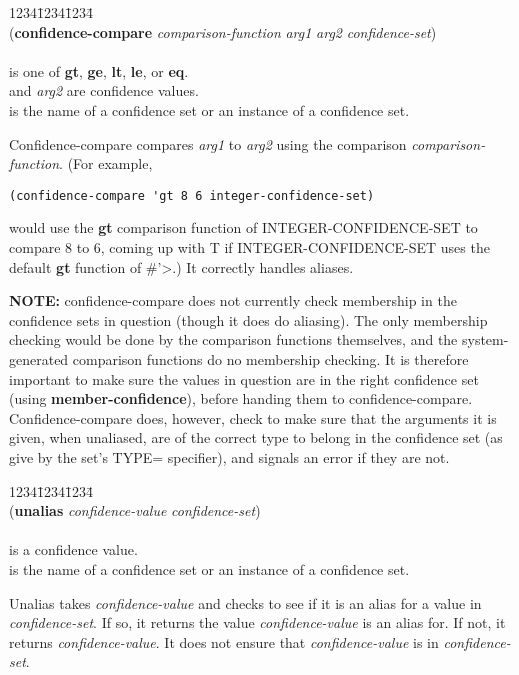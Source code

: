 \begin{tabbing}
1234\=1234\=1234\= \kill
\\
({\bf confidence-compare} {\it comparison-function\/} {\it arg1\/}
{\it arg2\/} {\it confidence-set}) \\
\\
 is one of {\bf gt}, {\bf ge}, {\bf lt},
{\bf le}, or {\bf eq}. \\
 and {\it arg2} are confidence values. \\
 is the name of a confidence set or an
instance of a confidence set. \\
\end{tabbing}
Confidence-compare compares {\it arg1} to {\it arg2} using the
comparison {\it comparison-function}. (For example, 
\begin{verbatim}
(confidence-compare 'gt 8 6 integer-confidence-set)
\end{verbatim}
would use the {\bf gt} comparison function of INTEGER-CONFIDENCE-SET
to compare 8 to 6, coming up with T if INTEGER-CONFIDENCE-SET uses the
default {\bf gt} function of \#'>.) It correctly handles aliases. 

{\bf NOTE:} confidence-compare does not currently check membership in
the confidence sets in question (though it does do aliasing). The only
membership checking would be done by the comparison functions
themselves, and the system-generated comparison functions do no
membership checking. It is therefore important to make sure the values
in question are in the right confidence set (using {\bf
member-confidence}), before handing them to confidence-compare.
Confidence-compare does, however, check to make sure that the
arguments it is given, when unaliased, are of the correct type to belong
in the confidence set (as give by the set's TYPE= specifier), and
signals an error if they are not.

\begin{tabbing}
1234\=1234\=1234\= \kill
\\
({\bf unalias} {\it confidence-value\/} {\it confidence-set}) \\
\\
 is a confidence value. \\
 is the name of a confidence set or an
instance of a confidence set. \\
\end{tabbing}
Unalias takes {\it confidence-value} and checks to see if it is an
alias for a value in {\it confidence-set}. If so, it returns the value
{\it confidence-value} is an alias for. If not, it returns {\it
confidence-value\/}. It does not ensure that {\it confidence-value} is
in {\it confidence-set\/}.

